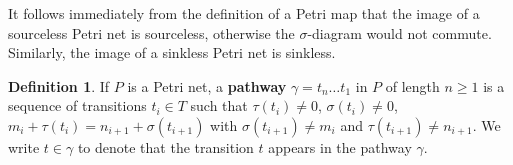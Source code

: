 \documentclass[aps,prd,onecolumn,nofootinbib,letterpaper,preprintnumbers,superscriptaddress,eqsecnum]{revtex4}
\theoremstyle{definition}
\newtheorem{definition}{Definition}
\begin{document}
It follows immediately from the definition of a Petri map that the image of a sourceless Petri net is sourceless, otherwise the $\sigma$-diagram would not commute.
Similarly, the image of a sinkless Petri net is sinkless.

\begin{figure}[!h]
\end{figure}

\begin{definition}\label{def:pathway}
    If $P$ is a Petri net, a \textbf{pathway} $\gamma = t_n \ldots t_1$ in $P$ of length $n \ge 1$ is a sequence of transitions $t_i \in T$ such that $\tau(t_i) \ne 0$, $\sigma(t_i) \ne 0$, $m_{i} + \tau(t_i) = n_{i+1} + \sigma(t_{i+1})$ with $\sigma(t_{i+1}) \ne m_{i}$ and $\tau(t_{i+1}) \ne n_{i+1}$. We write $t \in \gamma$ to denote that the transition $t$ appears in the pathway $\gamma$.
\end{definition}
\end{document}
